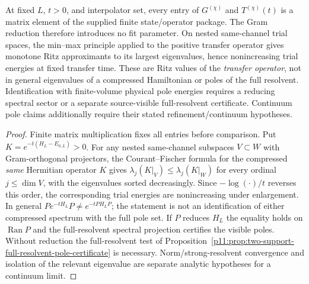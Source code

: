 \documentclass[12pt,a4paper]{article}
\begin{document}
\begin{theorem}
\label{p11:thm:no-parameter-same-channel-mixing}

At fixed \(L\), \(t>0\), and interpolator set, every entry of \(G^{(\chi)}\) and \(T^{(\chi)}(t)\) is a matrix element of the supplied finite state/operator package.  The Gram reduction therefore introduces no fit parameter.  On nested same-channel trial spaces, the min--max principle applied to the positive transfer operator gives monotone Ritz approximants to its largest eigenvalues, hence nonincreasing trial energies at fixed transfer time.  These are Ritz values of the \emph{transfer operator}, not in general eigenvalues of a compressed Hamiltonian or poles of the full resolvent. Identification with finite-volume physical pole energies requires a reducing spectral sector or a separate source-visible full-resolvent certificate. Continuum pole claims additionally require their stated refinement/continuum hypotheses.

\end{theorem}
\begin{proof}

Finite matrix multiplication fixes all entries before comparison.  Put $K=e^{-t(H_L-E_{0,L})}>0$. For any nested same-channel subspaces $V\subset W$ with Gram-orthogonal projectors, the Courant--Fischer formula for the compressed \emph{same} Hermitian operator $K$ gives $\lambda_j(K|_V)\leq\lambda_j(K|_W)$ for every ordinal $j\leq\dim V$, with the eigenvalues sorted decreasingly. Since $-\log(\cdot)/t$ reverses this order, the corresponding trial energies are nonincreasing under enlargement. In general $P e^{-tH_L}P\ne e^{-t P H_L P}$; the statement is not an identification of either compressed spectrum with the full pole set. If $P$ reduces $H_L$ the equality holds on $\operatorname{Ran}P$ and the full-resolvent spectral projection certifies the visible poles. Without reduction the full-resolvent test of Proposition~\ref{p11:prop:two-support-full-resolvent-pole-certificate} is necessary. Norm/strong-resolvent convergence and isolation of the relevant eigenvalue are separate analytic hypotheses for a continuum limit.
\end{proof}
\end{document}
